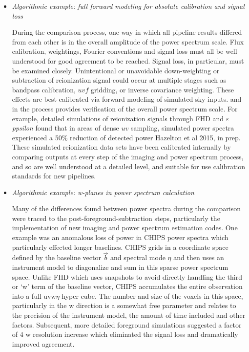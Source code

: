 \documentclass[twolcolumn]{emulateapj}
\def\eppsilon{{\it $\varepsilon$ppsilon}}
\def\eppsiloncite{Hazelton et al 2015, in prep}
\begin{document}
\begin{itemize}
\item \emph{Algorithmic example: full forward modeling for absolute calibration and signal loss}

During the comparison process, one way in which all pipeline results differed from each other is in the overall amplitude of the power spectrum scale. Flux calibration, weightings, Fourier conventions and signal loss must all be well understood for good agreement to be reached.  Signal loss, in particular, must be examined closely. Unintentional or unavoidable down-weighting or subtraction of reionization signal could occur at multiple stages such as bandpass calibration, $uvf$ gridding, or inverse covariance weighting. These effects are best calibrated via forward modeling of simulated sky inputs. and in the process provides verification of the overall power spectrum scale.  For example, detailed simulations of reionization signals through FHD and \eppsilon{} found that in areas of dense $uv$ sampling, simulated power spectra experienced a 50\% reduction of detected power \eppsiloncite{}.  These simulated reionization data sets have been calibrated internally by comparing outputs at every step of the imaging and power spectrum process, and so are well understood at a detailed level, and suitable for use calibration standards for new pipelines.



\item \emph{Algorithmic example: w-planes in power spectrum calculation}


Many of the differences found between power spectra during the comparison were traced to the post-foreground-subtraction steps, particularly the implementation of new imaging and power spectrum estimation codes.  One example was an anomalous loss of power in CHIPS power spectra which particularly effected longer baselines.  CHIPS grids in a coordinate space defined by the baseline vector $\vec{b}$ and spectral mode $\eta$ and then uses an instrument model to diagonalize and sum in this sparse power spectrum space.  Unlike FHD which uses snapshots to avoid directly handling the third or `w' term of the baseline vector, CHIPS accumulates the entire observation into a full uvw$\eta$ hyper-cube.  The number and size of the voxels in this space, particularly in the w direction is a somewhat free parameter and relates to the precision of the instrument model, the amount of time included and other factors.  Subsequent, more detailed foreground simulations suggested a factor of 4 w resolution increase which eliminated the signal loss and dramatically improved agreement.



\end{itemize}
\end{document}
